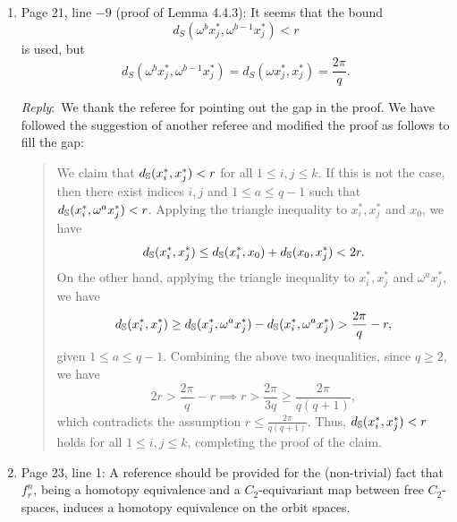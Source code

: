 \documentclass{amsart}
\newcommand{\ar}{\medskip\noindent\textit{Reply}:\ }
\begin{document}
\begin{enumerate}
		\smallskip
		We have also revised the definition of $\rho_{j-1}$ in the proof of Lemma 4.5.4 to use $h_r^{-1}$, as suggested by the reviewer. The revised part reads:
		\begin{quote}
			... The horizontal map $\rho^{j-1}$ in the left-hand-side square is the composition of the following maps introduced in \S4.4.2 and \S4.3.2, respectively:
			\[\VR_r(\cX_{j-1}) \xrightarrow{h^{-1}_r}\VR_r(\bS^{n_{j-1}})_G \xrightarrow{\tilde{f}_r^{n_{j-1}}} \cX_{j-1}.\]
			Since the \(G\)-action on \(\bS^{n_{j-1}}\) is VR-compatible, it is a strong \(r\)-diameter action for small enough $r>0$, making \(h_r\) an isomorphism by .2 and thus we can consider the inverse map $h^{-1}_r$.
		\end{quote}

		\item Page 21, line $-9$ (proof of Lemma 4.4.3): It seems that the bound
		\[
		d_S(\omega^b x_j^*, \omega^{b-1} x_j^*) < r
		\]
		is used, but
		\[
		d_S(\omega^b x_j^*, \omega^{b-1} x_j^*) = d_S(\omega x_j^*, x_j^*) = \frac{2\pi}{q}.
		\]

		\ar We thank the referee for pointing out the gap in the proof. We have followed the suggestion of another referee and modified the proof as follows to fill the gap:

		\medskip
		\begin{quote}
			We claim that $d_{\mathbb{S}}(x_i^*, x_j^*) < r$ for all $1 \le i,j \le k$.
			If this is not the case, then there exist indices $i,j$ and $1 \leq a \leq q-1$ such that $d_{\mathbb{S}}(x_i^*, \omega^a x_j^*) < r$.
			Applying the triangle inequality to $x_i^*, x_j^*$ and $x_0$, we have
			\[d_{\mathbb{S}}(x_i^*, x_j^*) \leq d_{\mathbb{S}}(x_i^*, x_0) + d_{\mathbb{S}}(x_0, x_j^*) < 2r.\]
			On the other hand, applying the triangle inequality to $x_i^*, x_j^*$ and $\omega^a x_j^*$, we have
			\[
			d_{\mathbb{S}}(x_i^*, x_j^*) \geq d_{\mathbb{S}}(x_j^*, \omega^a x_j^*) - d_{\mathbb{S}}(x_i^*, \omega^a x_j^*) > \frac{2\pi}{q} - r,
			\]
			given $1 \leq a \leq q-1$.
			Combining the above two inequalities, since $q \geq 2$, we have
			\[
			2r > \frac{2\pi}{q} - r \implies r > \frac{2\pi}{3q} \geq \frac{2\pi}{q(q+1)},
			\]
			which contradicts the assumption $r \le \frac{2\pi}{q(q+1)}$.
			Thus, $d_{\mathbb{S}}(x_i^*, x_j^*) < r$ holds for all $1 \le i,j \le k$, completing the proof of the claim.
		\end{quote}

		\item Page 23, line 1: A reference should be provided for the (non-trivial) fact that $f_r^n$, being a homotopy equivalence and a $C_2$-equivariant map between free $C_2$-spaces, induces a homotopy equivalence on the orbit spaces.


\end{enumerate}
\end{document}
